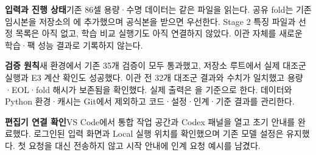 \textbf{입력과 진행 상태}\quad 기존 86셀 용량·수명 데이터는 같은 파일을 읽는다. 공유 fold는 기존 임시본을 저장소의 에 추가했으며 공식본을 받으면 우선한다. Stage 2 특징 파일과 선정 목록은 아직 없고, 학습 비교 실행기도 아직 연결하지 않았다. 이관 자체를 새로운 학습·팩 성능 결과로 기록하지 않는다.

\textbf{검증 원칙}\quad 새 환경에서 기존 35개 검증이 모두 통과했고, 저장소 루트에서 실제 대조군 실행과 E3 계산 확인도 성공했다. 이관 전 32개 대조군 결과와 수치가 일치했고 용량·EOL·fold 해시가 보존됨을 확인했다. 실제 출력은 을 기준으로 한다. 데이터와 Python 환경·캐시는 Git에서 제외하고 코드·설정·인계·기준 결과를 관리한다.

\textbf{편집기 연결 확인}\quad VS Code에서 통합 작업 공간과 Codex 패널을 열고 초기 안내를 완료했다. 로그인된 입력 화면과 Local 실행 위치를 확인했으며 기존 모델 설정은 유지했다. 첫 요청을 대신 전송하지 않고 시작 안내에 인계 요청 예시를 남겼다.

